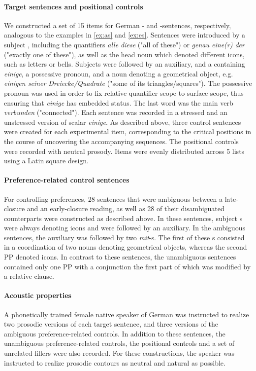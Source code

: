 \documentclass[fleqn,reqno,10pt,draft]{article}
\newcommand{\as}{\acro{as}}
\renewcommand{\es}{\acro{es}}
\begin{document}
\paragraph{Target sentences and positional controls}

We constructed a set of 15 items for German \as- and \es-sentences,
respectively, analogous to the examples in \ref{ex:as} and
\ref{ex:es}. Sentences were introduced by a subject {\small
  }, including the quantifiers {\it alle diese} ("all of
these") or {\it genau eine(r) der} ("exactly one of these"), as well
as the head noun which denoted different icons, such as letters or
bells. Subjects were followed by an auxiliary, and a {\small
  } containing {\it einige}, a possessive pronoun, and a noun
denoting a geometrical object, e.g. {\it einigen seiner
  Dreiecke/Quadrate} ("some of its triangles/squares"). The possessive
pronoun was used in order to fix relative quantifier scope to surface
scope, thus ensuring that {\it einige} has embedded status. The last
word was the main verb {\it verbunden} ("connected").  Each sentence
was recorded in a stressed and an unstressed version of scalar {\it
  einige}. As described above, three control
sentences were created for each experimental item, corresponding to
the critical positions in the course of uncovering the accompanying
sequences.  The positional controls were recorded with
neutral prosody.  Items were evenly distributed across 5 lists using a
Latin square design.


\paragraph{Preference-related control sentences}
For controlling preferences, 28 sentences that were ambiguous between
a late-closure and an early-closure reading, as well as 28 of their
disambiguated counterparts were constructed as described above. In
these sentences, subject {\small {}}s were always denoting
icons and were followed by an auxiliary. In the ambiguous sentences,
the auxiliary was followed by two {\it mit}-{\small {}}s.  The
first of these {\small {}}s consisted in a coordination of two
nouns denoting geometrical objects, whereas the second PP denoted
icons. In contrast to these sentences, the unambiguous sentences
contained only one PP with a conjunction the first part of which was
modified by a relative clause.

\paragraph{Acoustic properties}
A phonetically trained female native speaker of German was instructed
to realize two prosodic versions of each target sentence, and three
versions of the ambiguous preference-related controls. In addition to these
sentences, the unambiguous preference-related controls, the positional controls
and a set of unrelated fillers were also recorded. For these constructions, the speaker was instructed
to realize prosodic contours as neutral and natural as possible.
\end{document}
